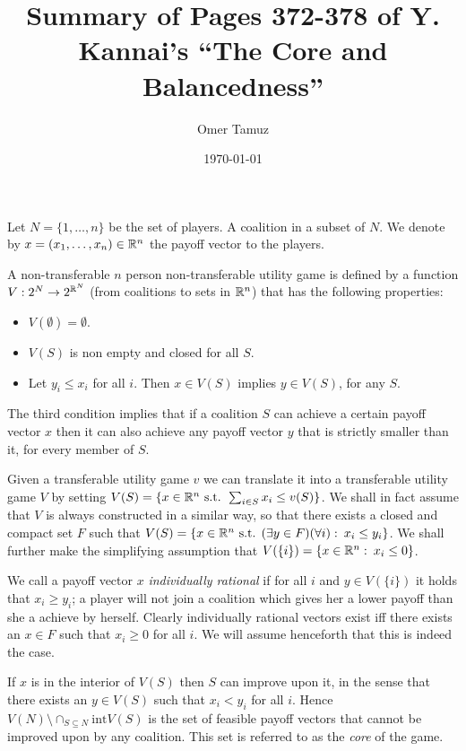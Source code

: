 \documentclass[11pt]{article} \usepackage{amssymb}
\begin{document}
\title{Summary of Pages 372-378 of Y. Kannai's ``The Core and
  Balancedness''}

\author{Omer Tamuz}
\date{\today}

\maketitle

Let $N=\{1,\ldots,n\}$ be the set of players. A coalition in a subset
of $N$. We denote by $x=(x_1,\ldots,x_n) \in \mathbb R^n$ the payoff vector
to the players.

A non-transferable $n$ person non-transferable utility game is defined
by a function $V:2^N \to 2^{\mathbb R^N}$ (from coalitions to sets in $\mathbb R^n$)
that has the following properties:
\begin{itemize}
\item $V(\emptyset) = \emptyset$.
\item $V(S)$ is non empty and closed for all $S$.
\item Let $y_i \leq x_i$ for all $i$. Then $x \in V(S)$ implies $y \in
  V(S)$, for any $S$.
\end{itemize}
The third condition implies that if a coalition $S$ can achieve a certain
payoff vector $x$ then it can also achieve any payoff vector $y$ that
is strictly smaller than it, for every member of $S$.

Given a transferable utility game $v$ we can translate it into a
transferable utility game $V$ by setting $V(S)=\{x \in \mathbb R^n \mbox{
  s.t. } \sum_{i \in S}x_i \leq v(S)\}$. We shall in fact assume that
$V$ is always constructed in a similar way, so that there exists a
closed and compact set $F$ such that $V(S)=\{x \in \mathbb R^n \mbox{
  s.t. } (\exists y \in F)(\forall i):\:x_i \leq y_i\}$. We shall
further make the simplifying assumption that $V(\{i\}) = \{x \in \mathbb R^n
:\: x_i \leq 0\}$.

We call a payoff vector $x$ {\em individually rational} if for all $i$
and $y \in V(\{i\})$ it holds that $x_i \geq y_i$; a player will not
join a coalition which gives her a lower payoff than she a achieve by
herself. Clearly individually rational vectors exist iff there exists
an $x \in F$ such that $x_i \geq 0$ for all $i$. We will assume
henceforth that this is indeed the case.

If $x$ is in the interior of $V(S)$ then $S$ can improve upon it, in
the sense that there exists an $y \in V(S)$ such that $x_i < y_i$ for
all $i$. Hence $V(N) \setminus \cap_{S \subseteq N} \mbox{int} V(S)$ is the
set of feasible payoff vectors that cannot be improved upon by any
coalition. This set is referred to as the {\em core} of the game.
\end{document}
